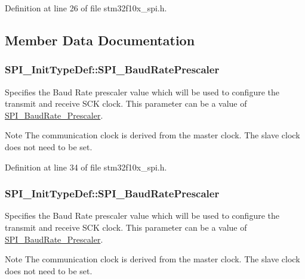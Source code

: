 Definition at line 26 of file stm32f10x\+\_\+spi.\+h.



\subsection{Member Data Documentation}
\subsubsection[{\texorpdfstring{S\+P\+I\+\_\+\+Baud\+Rate\+Prescaler}{SPI_BaudRatePrescaler}}]{ S\+P\+I\+\_\+\+Init\+Type\+Def\+::\+S\+P\+I\+\_\+\+Baud\+Rate\+Prescaler}\hypertarget{struct_s_p_i___init_type_def_af3e17db1e786d36898d9d7389e5a41e0}{}\label{struct_s_p_i___init_type_def_af3e17db1e786d36898d9d7389e5a41e0}
Specifies the Baud Rate prescaler value which will be used to configure the transmit and receive S\+CK clock. This parameter can be a value of \hyperlink{group___s_p_i___baud_rate___prescaler}{S\+P\+I\+\_\+\+Baud\+Rate\+\_\+\+Prescaler}. \begin{DoxyNote}{Note}
The communication clock is derived from the master clock. The slave clock does not need to be set. 
\end{DoxyNote}


Definition at line 34 of file stm32f10x\+\_\+spi.\+h.

\subsubsection[{\texorpdfstring{S\+P\+I\+\_\+\+Baud\+Rate\+Prescaler}{SPI_BaudRatePrescaler}}]{ S\+P\+I\+\_\+\+Init\+Type\+Def\+::\+S\+P\+I\+\_\+\+Baud\+Rate\+Prescaler}\hypertarget{struct_s_p_i___init_type_def_adfcf6178b6a117643111c13403f32e71}{}\label{struct_s_p_i___init_type_def_adfcf6178b6a117643111c13403f32e71}
Specifies the Baud Rate prescaler value which will be used to configure the transmit and receive S\+CK clock. This parameter can be a value of \hyperlink{group___s_p_i___baud_rate___prescaler}{S\+P\+I\+\_\+\+Baud\+Rate\+\_\+\+Prescaler}. \begin{DoxyNote}{Note}
The communication clock is derived from the master clock. The slave clock does not need to be set. 
\end{DoxyNote}


